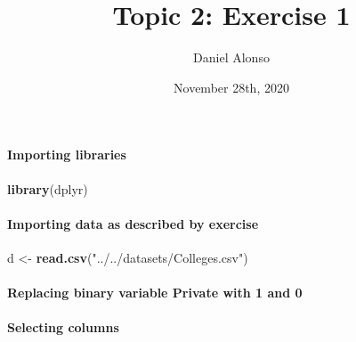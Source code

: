 \documentclass[]{article}
\title{Topic 2: Exercise 1}
\author{Daniel Alonso}
\date{November 28th, 2020}
\newenvironment{Shaded}{\begin{snugshade}}{\end{snugshade}}
\newcommand{\DecValTok}[1]{\textcolor[rgb]{0.00,0.00,0.81}{#1}}
\newcommand{\KeywordTok}[1]{\textcolor[rgb]{0.13,0.29,0.53}{\textbf{#1}}}
\newcommand{\NormalTok}[1]{#1}
\newcommand{\OperatorTok}[1]{\textcolor[rgb]{0.81,0.36,0.00}{\textbf{#1}}}
\newcommand{\StringTok}[1]{\textcolor[rgb]{0.31,0.60,0.02}{#1}}
\let\oldparagraph\paragraph
\renewcommand{\paragraph}[1]{\oldparagraph{#1}\mbox{}}
\begin{document}
\maketitle

\hypertarget{importing-libraries}{%
\paragraph{Importing libraries}\label{importing-libraries}}

\begin{Shaded}
\begin{Highlighting}[]
\KeywordTok{library}\NormalTok{(dplyr)}
\end{Highlighting}
\end{Shaded}

\hypertarget{importing-data-as-described-by-exercise}{%
\paragraph{Importing data as described by
exercise}\label{importing-data-as-described-by-exercise}}

\begin{Shaded}
\begin{Highlighting}[]
\NormalTok{d <-}\StringTok{ }\KeywordTok{read.csv}\NormalTok{(}\StringTok{"../../datasets/Colleges.csv"}\NormalTok{)}
\end{Highlighting}
\end{Shaded}

\hypertarget{replacing-binary-variable-private-with-1-and-0}{%
\paragraph{Replacing binary variable Private with 1 and
0}\label{replacing-binary-variable-private-with-1-and-0}}

\begin{Shaded}
\end{Shaded}

\hypertarget{selecting-columns}{%
\paragraph{Selecting columns}\label{selecting-columns}}
\end{document}
